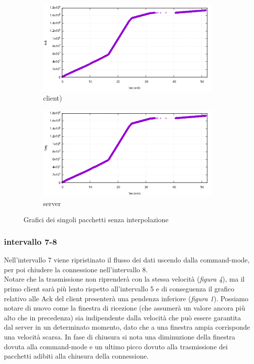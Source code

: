 \documentclass[12pt]{article}
\begin{document}
\begin{figure}[H]
	\begin{subfigure}[l]{0.5\linewidth}
		\includegraphics[width=\linewidth]{client_ack_point.png}
		\caption{client)}
	\end{subfigure}	
	\begin{subfigure}[r]{0.5\linewidth}
		\includegraphics[width=\linewidth]{server_seq_point.png}
		\caption{server}
	\end{subfigure}
	\caption{Grafici dei singoli pacchetti senza interpolazione}
	\label{ack_and_seq_point}
\end{figure}

\subsubsection{intervallo 7-8}
Nell’intervallo 7 viene ripristinato il flusso dei dati uscendo dalla command-mode, per poi chiudere la connessione nell’intervallo 8.\\
Notare che la trasmissione non riprenderà con la stessa velocità (\textit{figura 4}), ma il primo client sarà più lento rispetto all'intervallo 5 e di conseguenza il grafico relativo alle Ack del client presenterà una pendenza inferiore (\textit{figura 1}).
Possiamo notare di nuovo come la finestra di ricezione (che assumerà un valore ancora più alto che in precedenza) sia indipendente dalla velocità che può essere garantita dal server in un determinato momento, dato che a una finestra ampia corrisponde una velocità scarsa.
In fase di chiusura si nota una diminuzione della finestra dovuta alla command-mode e un ultimo picco dovuto alla trasmissione dei pacchetti adibiti alla chiusura della connessione.
\end{document}
